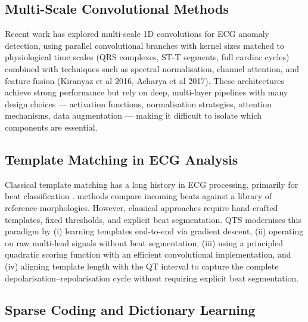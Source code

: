 \documentclass{iopjournal}
\begin{document}
\subsection{Multi-Scale Convolutional Methods}

Recent work has explored multi-scale 1D convolutions for ECG anomaly detection, using parallel convolutional branches with kernel sizes matched to physiological time scales (QRS complexes, ST-T segments, full cardiac cycles) combined with techniques such as spectral normalisation, channel attention, and feature fusion (Kiranyaz et al 2016, Acharya et al 2017). These architectures achieve strong performance but rely on deep, multi-layer pipelines with many design choices --- activation functions, normalisation strategies, attention mechanisms, data augmentation --- making it difficult to isolate which components are essential.

\subsection{Template Matching in ECG Analysis}

Classical template matching has a long history in ECG processing, primarily for beat classification .  methods compare incoming beats against a library of reference morphologies. However, classical approaches require hand-crafted templates, fixed thresholds, and explicit beat segmentation. QTS modernises this paradigm by (i) learning templates end-to-end via gradient descent, (ii) operating on raw multi-lead signals without beat segmentation, (iii) using a principled quadratic scoring function with an efficient convolutional implementation, and (iv) aligning template length with the QT interval to capture the complete depolarisation--repolarisation cycle without requiring explicit beat segmentation.

\subsection{Sparse Coding and Dictionary Learning}\label{sec:sparse-coding}
\end{document}
